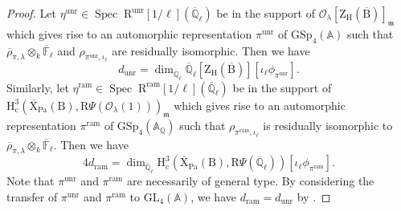 \documentclass[10pt]{amsart}
\numberwithin{equation}{section}
\theoremstyle{definition}
\def\GL{\mathrm{GL}}
\def\GSp{\mathrm{GSp}}
\def\ram{\mathrm{ram}}
\def\Pa{\mathrm{Pa}}
\DeclareMathOperator{\Spec}{Spec}
\def\calO{\mathcal{O}}
\def\fracm{\mathfrak{m}}
\def\FF{\mathbb{F}}
\def\QQ{\mathbb{Q}}
\def\rmc{\mathrm{c}}
\def\rmB{\mathrm{B}}
\def\rmH{\mathrm{H}}
\def\rmR{\mathrm{R}}
\def\rmX{\mathrm{X}}
\def\rmZ{\mathrm{Z}}
\def\unr{\mathrm{unr}}
\begin{document}
\begin{proof}
Let $\eta^{\unr}\in\Spec\phantom{.}\rmR^{\unr}[1/\ell](\overline{\QQ}_{\ell})$ be in the support of $\calO_{\lambda}[\rmZ_{\rmH}(\overline{\rmB})]_{\fracm}$ which gives rise to an automorphic representation $\pi^{\unr}$ of $\GSp_{4}(\mathbb{A})$ such that $\overline{\rho}_{\pi, \lambda}\otimes_{k}\overline{\FF}_{\ell}$ and $\rho_{\pi^{\unr},\iota_{\ell}}$ are residually isomorphic. Then we have
\begin{equation*}
d_{\unr}=\dim_{\overline{\QQ}_{\ell}}\overline{\QQ}_{\ell}[\rmZ_{\rmH}(\overline{\rmB})][\iota_{\ell}\phi_{\pi^{\unr}}].
\end{equation*}
Similarly, let $\eta^{\ram}\in\Spec\phantom{.}\rmR^{\ram}[1/\ell](\overline{\QQ}_{\ell})$ be in the support of $\rmH^{3}_{\rmc}(\overline{\rmX}_{\Pa}(\rmB), \rmR\Psi(\calO_{\lambda}(1)))_{\fracm}$ which gives rise to an automorphic representation $\pi^{\ram}$ of $\GSp_{4}(\mathbb{A}_{\QQ})$ such that $\rho_{\pi^{\ram},\iota_{\ell}}$ is residually isomorphic to $\overline{\rho}_{\pi, \lambda}\otimes_{k}\overline{\FF}_{\ell}$. Then we have
\begin{equation*}
4d_{\ram}=\dim_{\overline{\QQ}_{\ell}} \rmH^{3}_{\rmc}(\overline{\rmX}_{\Pa}(\rmB), \rmR\Psi(\overline{\QQ}_{\ell}))[\iota_{\ell}\phi_{\pi^{\ram}}].
\end{equation*}
Note that $\pi^{\unr}$ and $\pi^{\ram}$ are necessarily of general type. By considering the transfer of $\pi^{\unr}$ and $\pi^{\ram}$ to $\GL_{4}(\mathbb{A})$, we have $d_{\ram}=d_{\unr}$ by \cite[Lemma 6.4.2]{LTXZZ}.
\end{proof}
\end{document}
